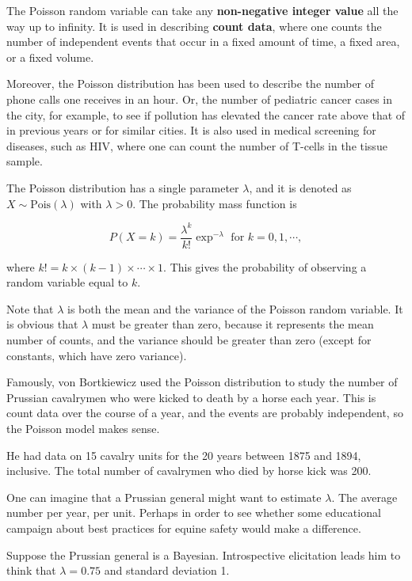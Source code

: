 \documentclass[]{book}
\theoremstyle{definition}
\theoremstyle{definition}
\theoremstyle{remark}
\let\BeginKnitrBlock\begin \let\EndKnitrBlock\end
\begin{document}
The Poisson random variable can take any \textbf{non-negative integer
value} all the way up to infinity. It is used in describing
\textbf{count data}, where one counts the number of independent events
that occur in a fixed amount of time, a fixed area, or a fixed volume.

Moreover, the Poisson distribution has been used to describe the number
of phone calls one receives in an hour. Or, the number of pediatric
cancer cases in the city, for example, to see if pollution has elevated
the cancer rate above that of in previous years or for similar cities.
It is also used in medical screening for diseases, such as HIV, where
one can count the number of T-cells in the tissue sample.

The Poisson distribution has a single parameter \(\lambda\), and it is
denoted as \(X \sim \text{Pois}(\lambda)\) with \(\lambda>0\). The
probability mass function is

\[P(X=k) = \frac{\lambda^k}{k!} \exp^{-\lambda} \text{ for } k=0,1,\cdots,\]

where \(k! = k \times (k-1) \times \cdots \times 1\). This gives the
probability of observing a random variable equal to \(k\).

Note that \(\lambda\) is both the mean and the variance of the Poisson
random variable. It is obvious that \(\lambda\) must be greater than
zero, because it represents the mean number of counts, and the variance
should be greater than zero (except for constants, which have zero
variance).

\BeginKnitrBlock{example}
\protect\hypertarget{ex:Poisson}{}{\label{ex:Poisson}}Famously, von
Bortkiewicz used the Poisson distribution to study the number of
Prussian cavalrymen who were kicked to death by a horse each year. This
is count data over the course of a year, and the events are probably
independent, so the Poisson model makes sense.

He had data on 15 cavalry units for the 20 years between 1875 and 1894,
inclusive. The total number of cavalrymen who died by horse kick was
200.

One can imagine that a Prussian general might want to estimate
\(\lambda\). The average number per year, per unit. Perhaps in order to
see whether some educational campaign about best practices for equine
safety would make a difference.
\EndKnitrBlock{example}

Suppose the Prussian general is a Bayesian. Introspective elicitation
leads him to think that \(\lambda=0.75\) and standard deviation 1.
\end{document}
